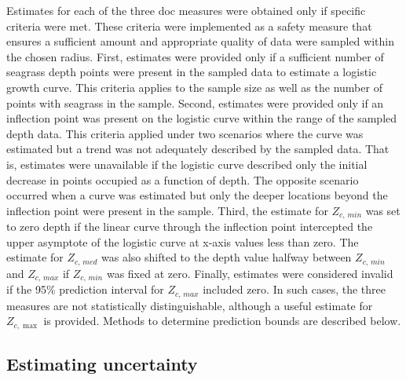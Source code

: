 \documentclass[letterpaper,12pt,oneside]{article}\usepackage[]{graphicx}\usepackage[]{color}
\begin{document}
Estimates for each of the three \ac{doc} measures were obtained only if specific criteria were met.  These criteria were implemented as a safety measure that ensures a sufficient amount and appropriate quality of data were sampled within the chosen radius.  First, estimates were provided only if a sufficient number of seagrass depth points were present in the sampled data to estimate a logistic growth curve.  This criteria applies to the sample size as well as the number of points with seagrass in the sample.  Second, estimates were provided only if an inflection point was present on the logistic curve within the range of the sampled depth data.  This criteria applied under two scenarios where the curve was estimated but a trend was not adequately described by the sampled data.  That is, estimates were unavailable if the logistic curve described only the initial decrease in points occupied as a function of depth.  The opposite scenario occurred when a curve was estimated but only the deeper locations beyond the inflection point were present in the sample.  Third, the estimate for $Z_{c,\,min}$ was set to zero depth if the linear curve through the inflection point intercepted the upper asymptote of the logistic curve at x-axis values less than zero.  The estimate for $Z_{c,\,med}$ was also shifted to the depth value halfway between $Z_{c,\,min}$ and $Z_{c,\,max}$ if $Z_{c,\,min}$ was fixed at zero.  Finally, estimates were considered invalid if the 95\% prediction interval for $Z_{c,\,max}$ included zero.  In such cases, the three measures are not statistically distinguishable, although a useful estimate for $Z_{c,\max}$ is provided.  Methods to determine prediction bounds are described below.  

\subsection{Estimating uncertainty}
\end{document}
